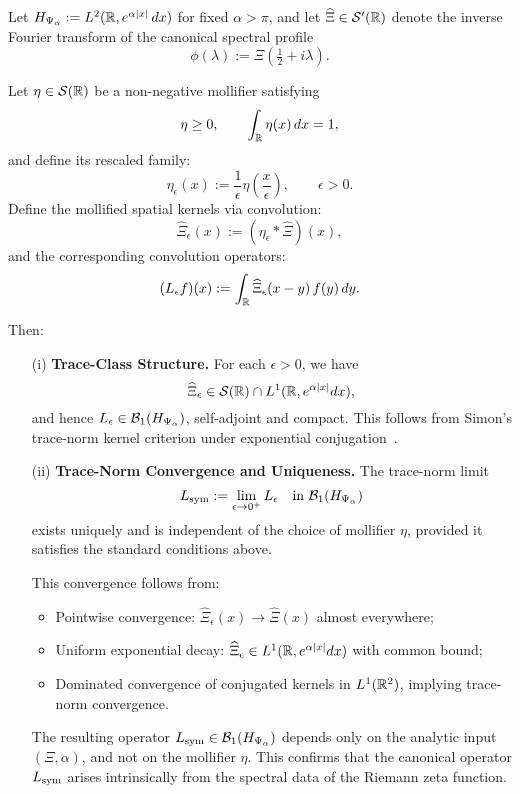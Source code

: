 \begin{lemma}
\label{lem:construction_canonical_data}
Let \( H_{\Psi_\alpha} := L^2(\mathbb{R}, e^{\alpha |x|}\, dx) \) for fixed \( \alpha > \pi \), and let \( \widehat{\Xi} \in \mathcal{S}'(\mathbb{R}) \) denote the inverse Fourier transform of the canonical spectral profile
\[
\phi(\lambda) := \Xi\left( \tfrac{1}{2} + i\lambda \right).
\]

Let \( \eta \in \mathcal{S}(\mathbb{R}) \) be a non-negative mollifier satisfying
\[
\eta \ge 0, \qquad \int_{\mathbb{R}} \eta(x)\, dx = 1,
\]
and define its rescaled family:
\[
\eta_\epsilon(x) := \frac{1}{\epsilon} \eta\left( \frac{x}{\epsilon} \right), \qquad \epsilon > 0.
\]
Define the mollified spatial kernels via convolution:
\[
\widehat{\Xi}_\epsilon(x) := (\eta_\epsilon * \widehat{\Xi})(x),
\]
and the corresponding convolution operators:
\[
(L_\epsilon f)(x) := \int_{\mathbb{R}} \widehat{\Xi}_\epsilon(x - y)\, f(y)\, dy.
\]

Then:
\begin{enumerate}
  \item[\textnormal{(i)}] \textbf{Trace-Class Structure.}  
  For each \( \epsilon > 0 \), we have
  \[
  \widehat{\Xi}_\epsilon \in \mathcal{S}(\mathbb{R}) \cap L^1(\mathbb{R}, e^{\alpha |x|} dx),
  \]
  and hence \( L_\epsilon \in \mathcal{B}_1(H_{\Psi_\alpha}) \), self-adjoint and compact.  
  This follows from Simon’s trace-norm kernel criterion under exponential conjugation~\cite[Thm.~3.1]{Simon2005TraceIdeals}.

  \item[\textnormal{(ii)}] \textbf{Trace-Norm Convergence and Uniqueness.}  
  The trace-norm limit
  \[
  L_{\mathrm{sym}} := \lim_{\epsilon \to 0^+} L_\epsilon \quad \text{in } \mathcal{B}_1(H_{\Psi_\alpha})
  \]
  exists uniquely and is independent of the choice of mollifier \( \eta \), provided it satisfies the standard conditions above.

  This convergence follows from:
  \begin{itemize}
    \item Pointwise convergence: \( \widehat{\Xi}_\epsilon(x) \to \widehat{\Xi}(x) \) almost everywhere;
    \item Uniform exponential decay: \( \widehat{\Xi}_\epsilon \in L^1(\mathbb{R}, e^{\alpha |x|} dx) \) with common bound;
    \item Dominated convergence of conjugated kernels in \( L^1(\mathbb{R}^2) \), implying trace-norm convergence.
  \end{itemize}

  The resulting operator \( L_{\mathrm{sym}} \in \mathcal{B}_1(H_{\Psi_\alpha}) \) depends only on the analytic input \( (\Xi, \alpha) \), and not on the mollifier \( \eta \). This confirms that the canonical operator \( L_{\mathrm{sym}} \) arises intrinsically from the spectral data of the Riemann zeta function.
\end{enumerate}
\end{lemma}
